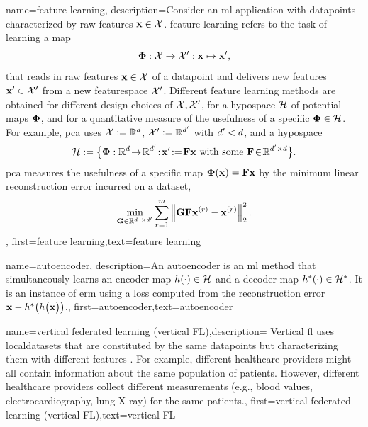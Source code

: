 {name={feature learning},
	description={Consider an \gls{ml} application with \gls{datapoint}s characterized by 
		raw \gls{feature}s ${\bf x} \in \mathcal{X}$. \Gls{feature} learning 
		refers to the task of learning a map 
		$${\bf \Phi}: \mathcal{X} \rightarrow \mathcal{X}': {\bf x} \mapsto {\bf x}',$$ 
		that reads in raw \gls{feature}s ${\bf x} \in \mathcal{X}$ of a \gls{datapoint} and delivers new 
		\gls{feature}s ${\bf x}' \in \mathcal{X}'$ from a new \gls{featurespace} $\mathcal{X}'$. 
		Different \gls{feature} learning methods are obtained for different design 
		choices of $\mathcal{X},\mathcal{X}'$, for a \gls{hypospace} $\mathcal{H}$ 
		of potential maps ${\bf \Phi}$, and for a quantitative measure of the usefulness of 
		a specific ${\bf \Phi} \in \mathcal{H}$. For example, \gls{pca} 
		uses $\mathcal{X} := \mathbb{R}^{d}$, $\mathcal{X}' := \mathbb{R}^{d'}$ 
		with $d' < d$, and a \gls{hypospace} 
		$$\hypospace\defeq \big\{ \featuremapvec: \mathbb{R}^{\dimlocalmodel}
		\!\rightarrow\! \mathbb{R}^{\dimlocalmodel'}\!:\!\featurevec'\!\defeq\!\mF \featurevec \mbox{ with some } \mF \!\in\! \mathbb{R}^{\dimlocalmodel' \times \dimlocalmodel} \big\}.$$ \Gls{pca} measures the usefulness of a specific map ${\bf \Phi}({\bf x})= \mathbf{F} {\bf x}$ 
	by the \gls{minimum} linear reconstruction error incurred on a \gls{dataset}, 
$$ \min_{\mG \in \mathbb{R}^{\dimlocalmodel \times \dimlocalmodel'}} \sum_{\sampleidx=1}^{\samplesize} \normgeneric{\mG \mF \featurevec^{(\sampleidx)} - \featurevec^{(\sampleidx)}}{2}^{2}.$$ }, 
	first={feature learning},text={feature learning}
} 

{name={autoencoder},
	description={An autoencoder is an \gls{ml} method that simultaneously learns an encoder map 
		$h(\cdot) \in \mathcal{H}$ and a decoder map $h^{*}(\cdot) \in \mathcal{H}^{*}$. 
		It is an instance of \gls{erm} using a \gls{loss} computed from the reconstruction error 
		${\bf x} - h^{*}\big(  h \big( {\bf x} \big) \big)$.},
	first={autoencoder},text={autoencoder}
} 

{name={vertical federated learning (vertical FL)},description=
	{Vertical \gls{fl} uses \gls{localdataset}s that are constituted 
	 by the same \gls{datapoint}s but characterizing them with different \gls{feature}s \cite{VFLChapter}. 
     For example, different healthcare providers might all contain information 
     about the same population of patients. However, different healthcare providers 
     collect different measurements (e.g., blood values, electrocardiography, lung X-ray) 
     for the same patients.},
	first={vertical federated learning (vertical FL)},text={vertical FL}
} 

